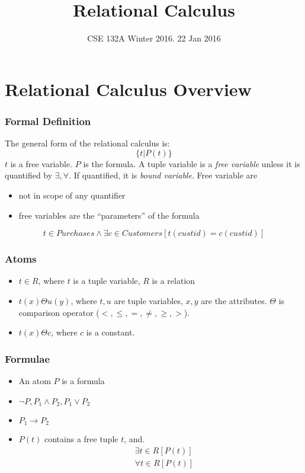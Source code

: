 \documentclass{beamer}
\begin{document}

\title{Relational Calculus}

\date[WI 2016]{CSE 132A Winter 2016. 22 Jan 2016}

\subject{Relational Calculus} %

\begin{frame}
  \titlepage
\end{frame}

\section{Relational Calculus Overview}
\begin{frame}
  \frametitle{Formal Definition}
  The general form of the relational calculus is:
  $$
  \{t | P(t)\}
  $$
  $t$ is a free variable. $P$ is the formula. A tuple variable is a \textit{free
variable} unless it is quantified by $\exists, \forall$. If quantified, it is \textit{bound
variable}. Free variable are 
\begin{itemize}
\item not in scope of any quantifier
\item free variables are the “parameters” of the formula
\end{itemize}
  $$
  t \in Purchases \wedge \exists c \in Customers [t(custid)=c(custid)]
  $$
\end{frame}

\begin{frame}
  \frametitle{Atoms}
  \begin{itemize}
  \item $t \in R$, where $t$ is a tuple variable, $R$ is a relation
  \item $t(x) \Theta u(y)$, where $t, u$ are tuple variables, $x, y$ are the attributes. $\Theta$ is comparison operator ($<, \leq, =, \neq, \geq, >$).
  \item $t(x) \Theta c$, where $c$ is a constant. 
  \end{itemize}
\end{frame}

\begin{frame}
  \frametitle{Formulae}
  \begin{itemize}
  \item An atom $P$ is a formula 
  \item $\neg P, P_1 \wedge P_2, P_1 \vee P_2$
  \item $P_1 \rightarrow P_2$
  \item $P(t)$ contains a free tuple $t$, and.
  \begin{align*}
  &\exists t \in R [P(t)]\\
  &\forall t \in R [P(t)]
  \end{align*}
  \end{itemize}
\end{frame}
\end{document}
